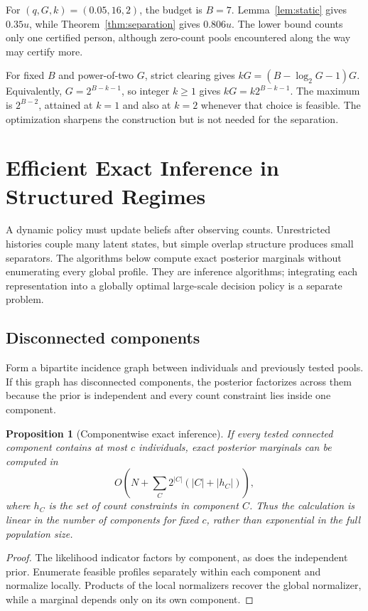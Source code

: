\documentclass[11pt]{article}
\newtheorem{proposition}{Proposition}
\begin{document}
For $(q,G,k)=(0.05,16,2)$, the budget is $B=7$. Lemma~\ref{lem:static}
gives $0.35u$, while Theorem~\ref{thm:separation} gives $0.806u$. The lower
bound counts only one certified person, although zero-count pools encountered
along the way may certify more.

For fixed $B$ and power-of-two $G$, strict clearing gives
$kG=(B-\log_2G-1)G$. Equivalently, $G=2^{B-k-1}$, so integer $k\geq1$ gives
$kG=k2^{B-k-1}$. The maximum is $2^{B-2}$, attained at $k=1$ and also at
$k=2$ whenever that choice is feasible. The optimization sharpens the
construction but is not needed for the separation.

\section{Efficient Exact Inference in Structured Regimes}
\label{sec:structured}

A dynamic policy must update beliefs after observing counts. Unrestricted
histories couple many latent states, but simple overlap structure produces small
separators. The algorithms below compute exact posterior marginals without
enumerating every global profile. They are inference algorithms; integrating
each representation into a globally optimal large-scale decision policy is a
separate problem.

\subsection{Disconnected components}

Form a bipartite incidence graph between individuals and previously tested
pools. If this graph has disconnected components, the posterior factorizes
across them because the prior is independent and every count constraint lies
inside one component.

\begin{proposition}[Componentwise exact inference]
If every tested connected component contains at most $c$ individuals, exact
posterior marginals can be computed in
\[
  O\!\left(N+\sum_C 2^{|C|}(|C|+|h_C|)\right),
\]
where $h_C$ is the set of count constraints in component $C$. Thus the
calculation is linear in the number of components for fixed $c$, rather than
exponential in the full population size.
\end{proposition}

\begin{proof}
The likelihood indicator factors by component, as does the independent prior.
Enumerate feasible profiles separately within each component and normalize
locally. Products of the local normalizers recover the global normalizer, while
a marginal depends only on its own component.
\end{proof}
\end{document}
